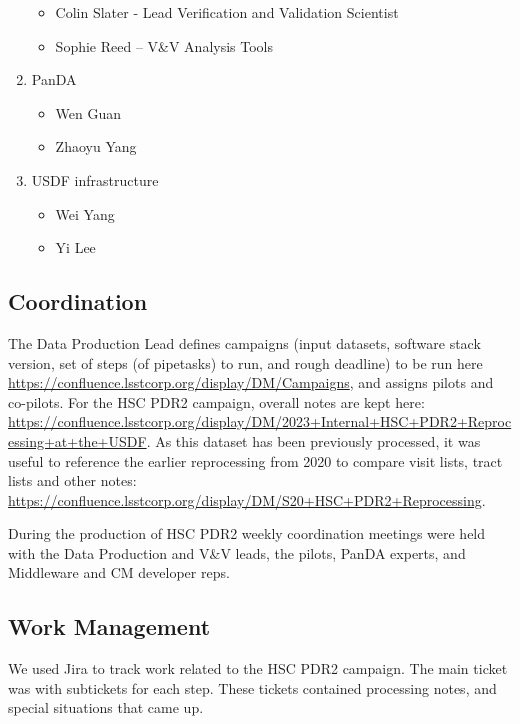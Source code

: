 \begin{enumerate}
\begin{itemize}
\item Colin Slater - Lead Verification and Validation Scientist
\item Sophie Reed -- V\&V Analysis Tools
\end{itemize}

\item PanDA
\begin{itemize}
\item Wen Guan
\item Zhaoyu Yang
\end{itemize}

\item USDF infrastructure
\begin{itemize}
\item Wei Yang
\item Yi Lee
\end{itemize}

\end{enumerate}

\subsection{Coordination}

The Data Production Lead defines campaigns (input datasets, software stack version, set of
steps (of pipetasks) to run, and rough deadline) to be run 
here \url{https://confluence.lsstcorp.org/display/DM/Campaigns}, and assigns pilots and co-pilots.
For the HSC PDR2 campaign, overall notes are kept here: \url{https://confluence.lsstcorp.org/display/DM/2023+Internal+HSC+PDR2+Reprocessing+at+the+USDF}.   As this dataset has been previously processed, it was useful
to reference the earlier reprocessing from 2020 to compare visit lists, tract lists and other notes:
\url{https://confluence.lsstcorp.org/display/DM/S20+HSC+PDR2+Reprocessing}.

During the production of HSC PDR2 weekly coordination meetings were held with the Data Production 
and V\&V leads, the pilots, PanDA experts, and Middleware and CM developer reps. 

\subsection{Work Management}

We used Jira to track work related to the HSC PDR2 campaign.
The main ticket was  with subtickets for each step.
These tickets contained processing notes, and special situations that came up.

